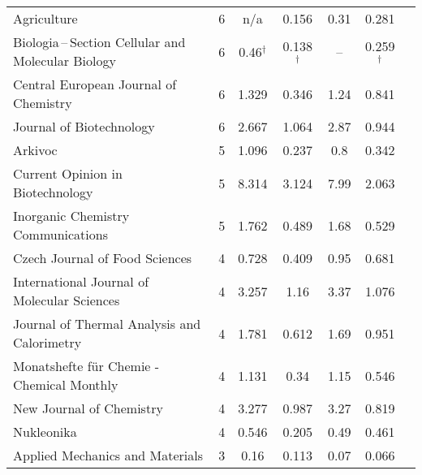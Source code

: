 {{\begin{longtable}[c]{lcccccc}
  Agriculture                                                                        & 6      & n/a     & 0.156 &  0.31      & 0.281                 \\[1ex]
  Biologia\,--\,Section Cellular and Molecular Biology                               & 6      & 0.46$^\dagger$    & 0.138 $^\dagger$ &  --       & 0.259$^\dagger$ \\
  Central European Journal of Chemistry                                             & 6      & 1.329   & 0.346 &  1.24      & 0.841                 \\
  Journal of Biotechnology                                                           & 6      & 2.667   & 1.064 &  2.87      & 0.944                 \\
  Arkivoc                                                                            & 5      & 1.096   & 0.237 &  0.8       & 0.342                 \\
  Current Opinion in Biotechnology                                                   & 5      & 8.314   & 3.124 &  7.99      & 2.063                 \\[1ex]
  Inorganic Chemistry Communications                                                 & 5      & 1.762   & 0.489 &  1.68      & 0.529                 \\
  Czech Journal of Food Sciences                                                     & 4      & 0.728   & 0.409 &  0.95      & 0.681                 \\
  International Journal of Molecular Sciences                                        & 4      & 3.257   & 1.16  &  3.37      & 1.076                 \\
  Journal of Thermal Analysis and Calorimetry                                        & 4      & 1.781   & 0.612 &  1.69      & 0.951                 \\
  Monatshefte für Chemie - Chemical Monthly                                          & 4      & 1.131   & 0.34  &  1.15      & 0.546                 \\[1ex]
  New Journal of Chemistry                                                           & 4      & 3.277   & 0.987 &  3.27      & 0.819                 \\
  Nukleonika                                                                         & 4      & 0.546   & 0.205 &  0.49      & 0.461                 \\
  Applied Mechanics and Materials                                                    & 3      & 0.16    & 0.113 &  0.07      & 0.066                 \\

\end{longtable}}}
